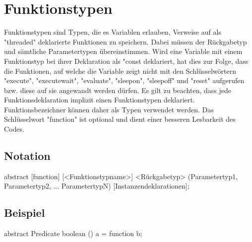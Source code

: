 \chapter{Funktionstypen}
Funktionstypen sind Typen, die es Variablen erlauben, Verweise auf als "threaded" deklarierte Funktionen zu speichern.
Dabei müssen der Rückgabetyp und sämtliche Parametertypen übereinstimmen.
Wird eine Variable mit einem Funktionstyp bei ihrer Deklaration als "const deklariert, hat dies zur Folge, dass die Funktionen,
auf welche die Variable zeigt nicht mit den Schlüsselwörtern "execute", "executewait", "evaluate", "sleepon", "sleepoff" und "reset" aufgerufen
bzw. diese auf sie angewandt werden dürfen.
Es gilt zu beachten, dass jede Funktionsdeklaration implizit einen Funktionstypen deklariert. Funktionsbezeichner können daher als Typen
verwendet werden.
Das Schlüsselwort "function" ist optional und dient einer besseren Lesbarkeit des Codes.

\section{Notation}
abstract [function] [<Funktionstypname>] <Rückgabetyp> (Parametertyp1, Parametertyp2, ... ParametertypN) [Instanzendeklarationen];

\section{Beispiel}
abstract Predicate boolean () a = function b;